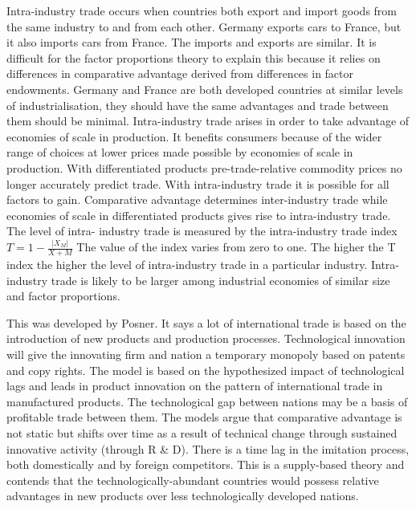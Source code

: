 \documentclass[12pt]{examnotes}
\begin{document}
\ra Intra-industry trade occurs when countries both export and import goods from the same industry to and from each other. Germany exports cars to France, but it also imports cars from France. 
\ra The imports and exports are similar. 
\ra It is difficult for the factor proportions theory to explain this because it relies on differences in comparative advantage derived from differences in factor endowments. Germany and France are both developed countries at similar levels of industrialisation, they should have the same advantages and trade between them should be minimal. 
\ra Intra-industry trade arises in order to take advantage of economies of scale in production. It benefits consumers because of the wider range of choices at lower prices made possible by economies of scale in production. 
\ra With differentiated products pre-trade-relative commodity prices no longer accurately predict trade.
\ra With intra-industry trade it is possible for all factors to gain.
\ra Comparative advantage determines inter-industry trade while economies of scale in differentiated products gives rise to intra-industry trade.
\ra The level of intra- industry trade is measured by the intra-industry trade index $T=1-\frac{|X_M|}{X+M}$
\ra The value of the index varies from zero to one. 
\ra The higher the T index the higher the level of intra-industry trade in a particular industry. 
\ra Intra-industry trade is likely to be larger among industrial economies of similar size and factor proportions.

\ra This was developed by Posner. 
\ra It says a lot of international trade is based on the introduction of new products and production processes. 
\ra Technological innovation will give the innovating firm and nation a temporary monopoly based on patents and copy rights. 
\ra The model is based on the hypothesized impact of technological lags and leads in product innovation on the pattern of international trade in manufactured products. 
\ra The technological gap between nations may be a basis of profitable trade between them. 
The models argue that comparative advantage is not static but shifts over time as a result of technical change through sustained innovative activity (through R \& D). 
There is a time lag in the imitation process, both domestically and by foreign competitors. 
This is a supply-based theory and contends that the technologically-abundant countries would possess relative advantages in new products over less technologically developed nations.
\end{document}
